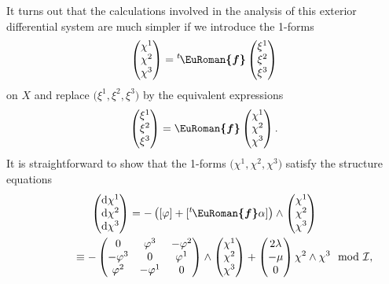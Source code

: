 \documentclass[pdftex]{sigma}
\numberwithin{equation}{section}
\newcommand{\eurom}{\EuRoman}
\renewcommand{\d}{\mathrm{d}}%
\newcommand{\cI}{{\mathcal I}}
\newcommand{\eurof}{\bm{\eurom{f}}}
\begin{document}
It turns out that the calculations involved in the analysis of this exterior differential system are much simpler if we introduce the 1-forms
\[ \begin{pmatrix} \chi^1 \\ \chi^2 \\ \chi^3 \end{pmatrix} = {}^t\hskip-1pt\eurof \begin{pmatrix} \xi^1 \\ \xi^2 \\ \xi^3 \end{pmatrix}\]
on $X$ and replace $\big(\xi^1, \xi^2, \xi^3\big)$ by the equivalent expressions
\[ \begin{pmatrix} \xi^1 \\ \xi^2 \\ \xi^3 \end{pmatrix} = \eurof \begin{pmatrix} \chi^1 \\ \chi^2 \\ \chi^3 \end{pmatrix}. \]
It is straightforward to show that the 1-forms $\big(\chi^1, \chi^2, \chi^3\big)$ satisfy the structure equations
\begin{gather*}%
\begin{pmatrix} \d\chi^1 \\ \d\chi^2 \\ \d\chi^3 \end{pmatrix} =
-\left( [\varphi] + [{}^t\hskip-1pt\eurof \alpha] \right) \wedge \begin{pmatrix} \chi^1 \\ \chi^2 \\ \chi^3 \end{pmatrix} \\
\hphantom{\begin{pmatrix} \d\chi^1 \\ \d\chi^2 \\ \d\chi^3 \end{pmatrix}}{}
 \equiv -\begin{pmatrix} 0 & \varphi^3 & -\varphi^2 \\ -\varphi^3 & 0 & \varphi^1 \\ \varphi^2 & -\varphi^1 & 0
\end{pmatrix} \wedge \begin{pmatrix} \chi^1 \\ \chi^2 \\ \chi^3 \end{pmatrix} + \begin{pmatrix} 2\lambda \\ -\mu \\ 0 \end{pmatrix} \chi^2 \wedge \chi^3 \mod{\cI},
\end{gather*}
\end{document}
